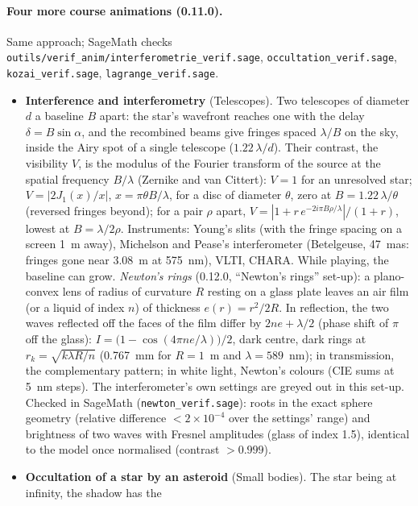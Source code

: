 \paragraph{Four more course animations (0.11.0).} Same approach; SageMath checks
\texttt{outils/verif\_anim/interferometrie\_verif.sage}, \texttt{occultation\_verif.sage}, \texttt{kozai\_verif.sage},
\texttt{lagrange\_verif.sage}.
\begin{itemize}
\item \textbf{Interference and interferometry} (Telescopes). Two telescopes of diameter $d$ a baseline $B$ apart: the
star's wavefront reaches one with the delay $\delta=B\sin\alpha$, and the recombined beams give fringes spaced
$\lambda/B$ on the sky, inside the Airy spot of a single telescope ($1.22\,\lambda/d$). Their contrast, the
visibility $V$, is the modulus of the Fourier transform of the source at the spatial frequency $B/\lambda$ (Zernike
and van Cittert): $V=1$ for an unresolved star; $V=|2J_1(x)/x|$, $x=\pi\theta B/\lambda$, for a disc of diameter
$\theta$, zero at $B=1.22\,\lambda/\theta$ (reversed fringes beyond); for a pair $\rho$ apart,
$V=|1+r\,e^{-2i\pi B\rho/\lambda}|/(1+r)$, lowest at $B=\lambda/2\rho$. Instruments: Young's slits (with the fringe
spacing on a screen 1~m away), Michelson and Pease's interferometer (Betelgeuse, 47~mas: fringes gone near 3.08~m at
575~nm), VLTI, CHARA. While playing, the baseline can grow.
\emph{Newton's rings} (0.12.0, “Newton's rings” set-up): a plano-convex lens of radius of curvature $R$ resting on a
glass plate leaves an air film (or a liquid of index $n$) of thickness $e(r)=r^2/2R$. In reflection, the two waves
reflected off the faces of the film differ by $2ne+\lambda/2$ (phase shift of $\pi$ off the glass):
$I=\bigl(1-\cos(4\pi ne/\lambda)\bigr)/2$, dark centre, dark rings at $r_k=\sqrt{k\lambda R/n}$ (0.767~mm for $R=1$~m and
$\lambda=589$~nm); in transmission, the complementary pattern; in white light, Newton's colours (CIE sums at 5~nm steps).
The interferometer's own settings are greyed out in this set-up. Checked in SageMath (\texttt{newton\_verif.sage}): roots in the exact
sphere geometry (relative difference $<2\times10^{-4}$ over the settings' range) and brightness of two waves with
Fresnel amplitudes (glass of index 1.5), identical to the model once normalised (contrast $>0.999$).
\item \textbf{Occultation of a star by an asteroid} (Small bodies). The star being at infinity, the shadow has the

\end{itemize}

